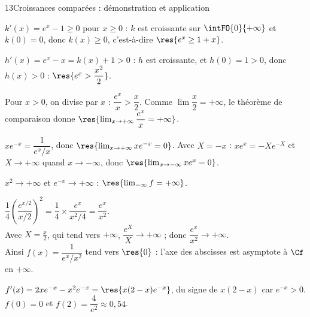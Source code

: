 \begin{corrige}{13}{Croissances comparées : démonstration et application}
\begin{questions}
  \item $k'(x)=e^{x}-1\geq0$ pour $x\geq0$ : $k$ est croissante sur $\intFO{0}{+\infty}$ et $k(0)=0$, donc
    $k(x)\geq0$, c'est-à-dire $\res{e^{x}\geq1+x}$.
  \item $h'(x)=e^{x}-x=k(x)+1>0$ : $h$ est croissante, et $h(0)=1>0$, donc $h(x)>0$ : $\res{e^{x}>\dfrac{x^{2}}{2}}$.
  \item Pour $x>0$, on divise par $x$ : $\dfrac{e^{x}}{x}>\dfrac{x}{2}$. Comme $\lim\dfrac x2=+\infty$, le théorème de
    comparaison donne $\res{\lim_{x\to+\infty}\dfrac{e^{x}}{x}=+\infty}$.
  \item $xe^{-x}=\dfrac{1}{e^{x}/x}$, donc $\res{\lim_{x\to+\infty}xe^{-x}=0}$. Avec $X=-x$ :
    $xe^{x}=-Xe^{-X}$ et $X\to+\infty$ quand $x\to-\infty$, donc $\res{\lim_{x\to-\infty}xe^{x}=0}$.
\end{questions}
\begin{questions}[resume]
  \item \begin{questions}
      \item $x^{2}\to+\infty$ et $e^{-x}\to+\infty$ : $\res{\lim_{-\infty}f=+\infty}$.
      \item $\dfrac14\left(\dfrac{e^{x/2}}{x/2}\right)^{2}=\dfrac14\times\dfrac{e^{x}}{x^{2}/4}=\dfrac{e^{x}}{x^{2}}$.\\[1mm]
        Avec $X=\frac x2$, qui tend vers $+\infty$, $\dfrac{e^{X}}{X}\to+\infty$ ; donc $\dfrac{e^{x}}{x^{2}}\to+\infty$.\\[1mm]
        Ainsi $f(x)=\dfrac{1}{e^{x}/x^{2}}$ tend vers $\res{0}$ : l'axe des abscisses est asymptote à $\Cf$ en $+\infty$.
    \end{questions}
  \item $f'(x)=2xe^{-x}-x^{2}e^{-x}=\res{x(2-x)e^{-x}}$, du signe de $x(2-x)$ car $e^{-x}>0$.
    $f(0)=0$ et $f(2)=\dfrac{4}{e^{2}}\approx0{,}54$.
\end{questions}
\noindent
\begin{minipage}[c]{0.53\linewidth}
\centering
\begin{tableau}
\end{tableau}

\end{minipage}
\end{corrige}
